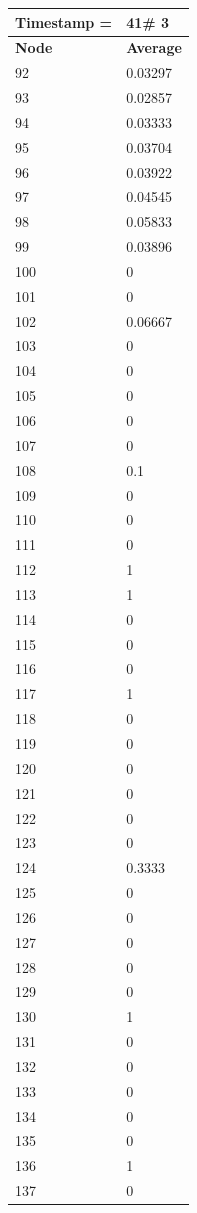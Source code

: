 \begin{tabular}{|l||l|}
\hline
\textbf{Timestamp =} & \textbf{41}\# 3\\\hline
	\textbf{Node} & \textbf{Average} \\ \hline
\hline
	92 & 0.03297 \\ \hline
	93 & 0.02857 \\ \hline
	94 & 0.03333 \\ \hline
	95 & 0.03704 \\ \hline
	96 & 0.03922 \\ \hline
	97 & 0.04545 \\ \hline
	98 & 0.05833 \\ \hline
	99 & 0.03896 \\ \hline
	100 & 0 \\ \hline
	101 & 0 \\ \hline
	102 & 0.06667 \\ \hline
	103 & 0 \\ \hline
	104 & 0 \\ \hline
	105 & 0 \\ \hline
	106 & 0 \\ \hline
	107 & 0 \\ \hline
	108 & 0.1 \\ \hline
	109 & 0 \\ \hline
	110 & 0 \\ \hline
	111 & 0 \\ \hline
	112 & 1 \\ \hline
	113 & 1 \\ \hline
	114 & 0 \\ \hline
	115 & 0 \\ \hline
	116 & 0 \\ \hline
	117 & 1 \\ \hline
	118 & 0 \\ \hline
	119 & 0 \\ \hline
	120 & 0 \\ \hline
	121 & 0 \\ \hline
	122 & 0 \\ \hline
	123 & 0 \\ \hline
	124 & 0.3333 \\ \hline
	125 & 0 \\ \hline
	126 & 0 \\ \hline
	127 & 0 \\ \hline
	128 & 0 \\ \hline
	129 & 0 \\ \hline
	130 & 1 \\ \hline
	131 & 0 \\ \hline
	132 & 0 \\ \hline
	133 & 0 \\ \hline
	134 & 0 \\ \hline
	135 & 0 \\ \hline
	136 & 1 \\ \hline
	137 & 0 \\ \hline
\end{tabular}

